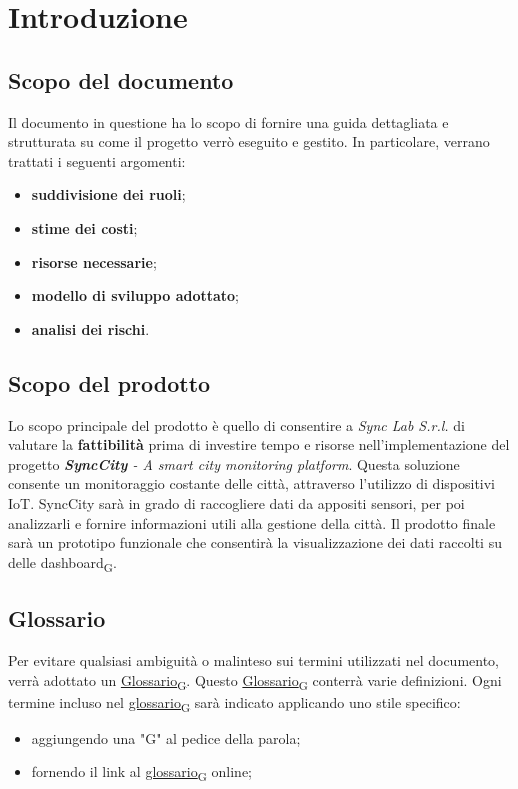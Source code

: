 \section{Introduzione}
\setcounter{subsection}{0}
\subsection{Scopo del documento}
Il documento in questione ha lo scopo di fornire una guida dettagliata e strutturata su come il progetto verrò eseguito e gestito. In particolare, verrano trattati i seguenti argomenti:
\begin{itemize}
    \item \textbf{suddivisione dei ruoli};
    \item \textbf{stime dei costi};
    \item \textbf{risorse necessarie};
    \item \textbf{modello di sviluppo adottato};
    \item \textbf{analisi dei rischi}.
\end{itemize}

\subsection{Scopo del prodotto}
Lo scopo principale del prodotto è quello di consentire a \textit{Sync Lab S.r.l.} di valutare la \textbf{fattibilità} prima di investire tempo e risorse nell'implementazione del progetto  \textit{\textbf{SyncCity} - A smart city monitoring platform}. Questa soluzione consente un monitoraggio costante delle città, attraverso l'utilizzo di dispositivi IoT. SyncCity sarà in grado di raccogliere dati da appositi sensori, per poi analizzarli e fornire informazioni utili alla gestione della città. Il prodotto finale sarà un prototipo funzionale che consentirà la visualizzazione dei dati raccolti su delle {dashboard\textsubscript{G}}.

\subsection{Glossario}
Per evitare qualsiasi ambiguità o malinteso sui termini utilizzati nel documento, verrà adottato un \href{https://7last.github.io/docs/rtb/documentazione-interna/glossario#glossario}{Glossario\textsubscript{G}}. Questo \href{https://7last.github.io/docs/rtb/documentazione-interna/glossario#glossario}{Glossario\textsubscript{G}} conterrà varie definizioni. Ogni termine incluso nel \href{https://7last.github.io/docs/rtb/documentazione-interna/glossario#glossario}{glossario\textsubscript{G}} sarà indicato applicando uno stile specifico:
\begin{itemize}
    \item aggiungendo una "G" al pedice della parola;
    \item fornendo il link al \href{https://7last.github.io/docs/rtb/documentazione-interna/glossario\#glossario}{glossario\textsubscript{G}} online;
\end{itemize}

